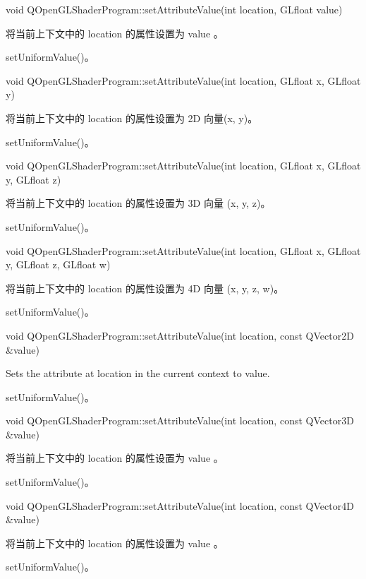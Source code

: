 void QOpenGLShaderProgram::setAttributeValue(int location, GLfloat value)

将当前上下文中的 location 的属性设置为 value 。


\begin{seeAlso}
setUniformValue()。
\end{seeAlso}

void QOpenGLShaderProgram::setAttributeValue(int location, GLfloat x, GLfloat y)

将当前上下文中的 location 的属性设置为 2D 向量(x, y)。

\begin{seeAlso}
setUniformValue()。
\end{seeAlso}

void QOpenGLShaderProgram::setAttributeValue(int location, GLfloat x, GLfloat y, GLfloat z)

将当前上下文中的 location 的属性设置为 3D 向量 (x, y, z)。

\begin{seeAlso}
setUniformValue()。
\end{seeAlso}

void QOpenGLShaderProgram::setAttributeValue(int location, GLfloat x, GLfloat y, GLfloat z, GLfloat w)

将当前上下文中的 location 的属性设置为 4D 向量 (x, y, z, w)。

\begin{seeAlso}
setUniformValue()。
\end{seeAlso}

void QOpenGLShaderProgram::setAttributeValue(int location, const QVector2D \&value)

Sets the attribute at location in the current context to value.

\begin{seeAlso}
setUniformValue()。
\end{seeAlso}

void QOpenGLShaderProgram::setAttributeValue(int location, const QVector3D \&value)

将当前上下文中的 location 的属性设置为 value 。

\begin{seeAlso}
setUniformValue()。
\end{seeAlso}

void QOpenGLShaderProgram::setAttributeValue(int location, const QVector4D \&value)

将当前上下文中的 location 的属性设置为 value 。

\begin{seeAlso}
setUniformValue()。
\end{seeAlso}

